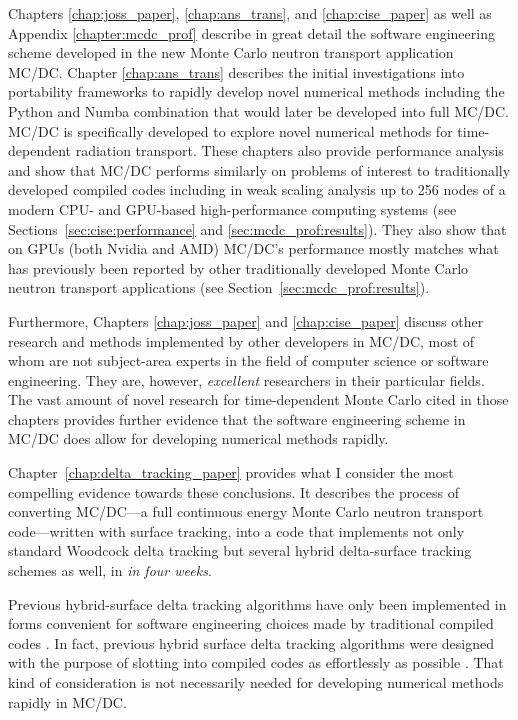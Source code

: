 Chapters \ref{chap:joss_paper}, \ref{chap:ans_trans}, and \ref{chap:cise_paper} as well as Appendix \ref{chapter:mcdc_prof} describe in great detail the software engineering scheme developed in the new Monte Carlo neutron transport application MC/DC.
Chapter \ref{chap:ans_trans} describes the initial investigations into portability frameworks to rapidly develop novel numerical methods including the Python and Numba combination that would later be developed into full MC/DC.
MC/DC is specifically developed to explore novel numerical methods for time-dependent radiation transport.
These chapters also provide performance analysis and show that MC/DC performs similarly on problems of interest to traditionally developed compiled codes including in weak scaling analysis up to 256 nodes of a modern CPU- and GPU-based high-performance computing systems (see Sections~\ref{sec:cise:performance} and \ref{sec:mcdc_prof:results}).
They also show that on GPUs (both Nvidia and AMD) MC/DC's performance mostly matches what has previously been reported by other traditionally developed Monte Carlo neutron transport applications (see Section~\ref{sec:mcdc_prof:results}).

Furthermore, Chapters \ref{chap:joss_paper} and \ref{chap:cise_paper} discuss other research and methods implemented by other developers in MC/DC, most of whom are not subject-area experts in the field of computer science or software engineering.
They are, however, \emph{excellent} researchers in their particular fields.
The vast amount of novel research for time-dependent Monte Carlo cited in those chapters provides further evidence that the software engineering scheme in MC/DC does allow for developing numerical methods rapidly.

Chapter~\ref{chap:delta_tracking_paper} provides what I consider the most compelling evidence towards these conclusions.
It describes the process of converting MC/DC---a full continuous energy Monte Carlo neutron transport code---written with surface tracking, into a code that implements not only standard Woodcock delta tracking but several hybrid delta-surface tracking schemes as well, in \emph{in four weeks}.

Previous hybrid-surface delta tracking algorithms have only been implemented in forms convenient for software engineering choices made by traditional compiled codes \cite{leppanen_development_2013conf}.
In fact, previous hybrid surface delta tracking algorithms were designed with the purpose of slotting into compiled codes as effortlessly as possible \cite{morgan2023delta}.
That kind of consideration is not necessarily needed for developing numerical methods rapidly in MC/DC.

